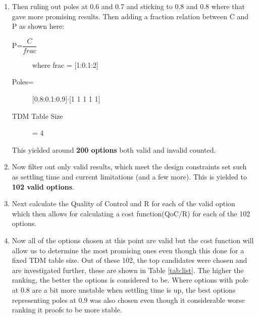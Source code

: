 \begin{enumerate}
	\item Then ruling out poles at 0.6 and 0.7 and sticking to 0.8 and 0.8 where that gave more promising results. Then adding a fraction relation between C and P as shown here:
		\begin{description}
			\item[P=$\dfrac{C}{frac}$] where frac = [1:0.1:2]
			\item[Poles=] [0.8:0.1:0.9]$\cdot$[1 1 1 1 1]
			\item[TDM Table Size] = 4
		\end{description}
	This yielded around \textbf{200 options} both valid and invalid counted.
	\item Now filter out only valid results, which meet the design constraints set such as settling time and current limitations (and a few more). This is yielded to \textbf{102 valid options}.
	\item Next calculate the Quality of Control and R for each of the valid option which then allows for calculating a cost function(QoC/R) for each of the 102 options.
	\item Now all of the options chosen at this point are valid but the cost function will allow us to determine the most promising ones even though this done for a fixed TDM table size. Out of these 102, the top candidates were chosen and are investigated further, these are shown in Table \ref{tab:list}. The higher the ranking, the better the options is considered to be. Where options with pole at 0.8 are a bit more unstable when settling time is up, the best options representing poles at 0.9 was also chosen even though it considerable worse ranking it proofs to be more stable.
	

\end{enumerate}
